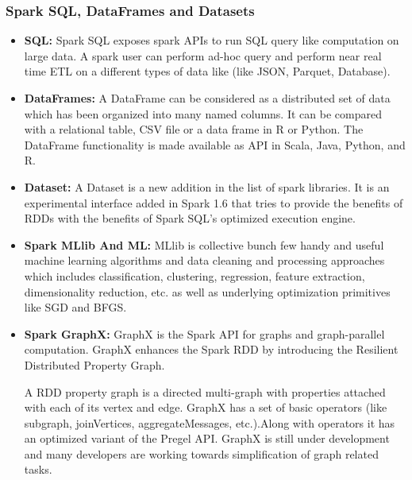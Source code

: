 \subsubsection{Spark SQL, DataFrames and Datasets}
\begin{itemize} 
\item \textbf{SQL:}
Spark SQL exposes spark APIs to run SQL query like computation on large data. A spark user can perform ad-hoc query and perform near real time ETL on a different types of data like (like JSON, Parquet, Database).

\item \textbf{DataFrames:}
A DataFrame can be considered as a distributed set of data which has been organized into many named columns. It can be compared with a relational table, CSV file or a data frame in R or Python. The DataFrame functionality is made available as API in Scala, Java, Python, and R.

\item \textbf{Dataset:}
A Dataset is a new addition in the list of spark libraries. It is an experimental interface added in Spark 1.6 that tries to provide the benefits of RDDs with the benefits of Spark SQL’s optimized execution engine.

\item \textbf{Spark MLlib And ML:}
MLlib is collective bunch few handy and useful machine learning algorithms and data cleaning and processing approaches which includes classification, clustering, regression, feature extraction, dimensionality reduction, etc. as well as underlying optimization primitives like SGD and BFGS.

\item \textbf{Spark GraphX:}
GraphX is the Spark API for graphs and graph-parallel computation. GraphX enhances the Spark RDD by introducing the Resilient Distributed Property Graph.

A RDD property graph is a directed multi-graph with properties attached with each of its vertex and edge. GraphX has a set of basic operators (like subgraph, joinVertices, aggregateMessages, etc.).Along with operators it has an optimized variant of the Pregel API. GraphX is still under development and many developers are working towards simplification of graph related tasks.

\end{itemize}

